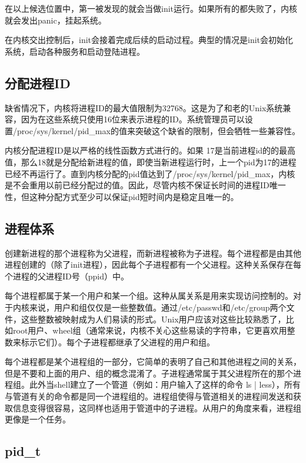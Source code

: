 在以上候选位置中，第一被发现的就会当做init运行。如果所有的都失败了，内核就会发出panic，挂起系统。

在内核交出控制后，init会接着完成后续的启动过程。典型的情况是init会初始化系统，启动各种服务和启动登陆进程。

\subsection{分配进程ID}

缺省情况下，内核将进程ID的最大值限制为32768。这是为了和老的Unix系统兼容，因为在这些系统只使用16位来表示进程的ID。系统管理员可以设置/proc/sys/kernel/pid\_max的值来突破这个缺省的限制，但会牺牲一些兼容性。

内核分配进程ID是以严格的线性函数方式进行的。如果 17是当前进程id的的最高值，那么18就是分配给新进程的值，即使当新进程运行时，上一个pid为17的进程已经不再运行了。直到内核分配的pid值达到了/proc/sys/kernel/pid\_max，内核是不会重用以前已经分配过的值。因此，尽管内核不保证长时间的进程ID唯一性，但这种分配方式至少可以保证pid短时间内是稳定且唯一的。
 
\subsection{进程体系}

创建新进程的那个进程称为父进程，而新进程被称为子进程。每个进程都是由其他进程创建的（除了init进程），因此每个子进程都有一个父进程。这种关系保存在每个进程的父进程ID号（ppid）中。

每个进程都属于某一个用户和某一个组。这种从属关系是用来实现访问控制的。对于内核来说，用户和组仅仅是一些整数值。通过/etc/passwd和/etc/group两个文件，这些整数被映射成为人们易读的形式。Unix用户应该对这些比较熟悉了，比如root用户、wheel组（通常来说，内核不关心这些易读的字符串，它更喜欢用整数来标示它们）。每个子进程都继承了父进程的用户和组。

每个进程都是某个进程组的一部分，它简单的表明了自己和其他进程之间的关系，但是不要和上面的用户、组的概念混淆了。子进程通常属于其父进程所在的那个进程组。此外当shell建立了一个管道（例如：用户输入了这样的命令 ls | less），所有与管道有关的命令都是同一个进程组的。进程组使得与管道相关的进程间发送和获取信息变得很容易，这同样也适用于管道中的子进程。从用户的角度来看，进程组更像是一个任务。

\subsection{pid\_t}

